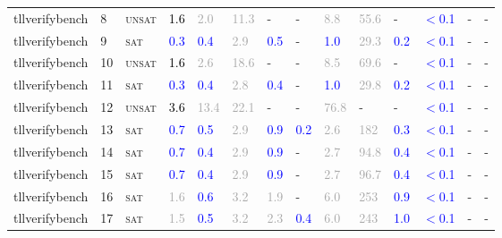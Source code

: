\begin{center}
{\begin{longtable}{@{}llllllllllllll@{}}
tllverifybench & 8 & \textsc{unsat} & \textcolor{black}{1.6} & \textcolor{darkgray}{2.0} & \textcolor{darkgray}{11.3} & - & - & \textcolor{darkgray}{8.8} & \textcolor{darkgray}{55.6} & - & \textcolor{blue}{$<$0.1} & - & - \\
tllverifybench & 9 & \textsc{sat} & \textcolor{blue}{0.3} & \textcolor{blue}{0.4} & \textcolor{darkgray}{2.9} & \textcolor{blue}{0.5} & - & \textcolor{blue}{1.0} & \textcolor{darkgray}{29.3} & \textcolor{blue}{0.2} & \textcolor{blue}{$<$0.1} & - & - \\
tllverifybench & 10 & \textsc{unsat} & \textcolor{black}{1.6} & \textcolor{darkgray}{2.6} & \textcolor{darkgray}{18.6} & - & - & \textcolor{darkgray}{8.5} & \textcolor{darkgray}{69.6} & - & \textcolor{blue}{$<$0.1} & - & - \\
tllverifybench & 11 & \textsc{sat} & \textcolor{blue}{0.3} & \textcolor{blue}{0.4} & \textcolor{darkgray}{2.8} & \textcolor{blue}{0.4} & - & \textcolor{blue}{1.0} & \textcolor{darkgray}{29.8} & \textcolor{blue}{0.2} & \textcolor{blue}{$<$0.1} & - & - \\
tllverifybench & 12 & \textsc{unsat} & \textcolor{black}{3.6} & \textcolor{darkgray}{13.4} & \textcolor{darkgray}{22.1} & - & - & \textcolor{darkgray}{76.8} & - & - & \textcolor{blue}{$<$0.1} & - & - \\
tllverifybench & 13 & \textsc{sat} & \textcolor{blue}{0.7} & \textcolor{blue}{0.5} & \textcolor{darkgray}{2.9} & \textcolor{blue}{0.9} & \textcolor{blue}{0.2} & \textcolor{darkgray}{2.6} & \textcolor{darkgray}{182} & \textcolor{blue}{0.3} & \textcolor{blue}{$<$0.1} & - & - \\
tllverifybench & 14 & \textsc{sat} & \textcolor{blue}{0.7} & \textcolor{blue}{0.4} & \textcolor{darkgray}{2.9} & \textcolor{blue}{0.9} & - & \textcolor{darkgray}{2.7} & \textcolor{darkgray}{94.8} & \textcolor{blue}{0.4} & \textcolor{blue}{$<$0.1} & - & - \\
tllverifybench & 15 & \textsc{sat} & \textcolor{blue}{0.7} & \textcolor{blue}{0.4} & \textcolor{darkgray}{2.9} & \textcolor{blue}{0.9} & - & \textcolor{darkgray}{2.7} & \textcolor{darkgray}{96.7} & \textcolor{blue}{0.4} & \textcolor{blue}{$<$0.1} & - & - \\
tllverifybench & 16 & \textsc{sat} & \textcolor{darkgray}{1.6} & \textcolor{blue}{0.6} & \textcolor{darkgray}{3.2} & \textcolor{darkgray}{1.9} & - & \textcolor{darkgray}{6.0} & \textcolor{darkgray}{253} & \textcolor{blue}{0.9} & \textcolor{blue}{$<$0.1} & - & - \\
tllverifybench & 17 & \textsc{sat} & \textcolor{darkgray}{1.5} & \textcolor{blue}{0.5} & \textcolor{darkgray}{3.2} & \textcolor{darkgray}{2.3} & \textcolor{blue}{0.4} & \textcolor{darkgray}{6.0} & \textcolor{darkgray}{243} & \textcolor{blue}{1.0} & \textcolor{blue}{$<$0.1} & - & - \\

\end{longtable}}
\end{center}
